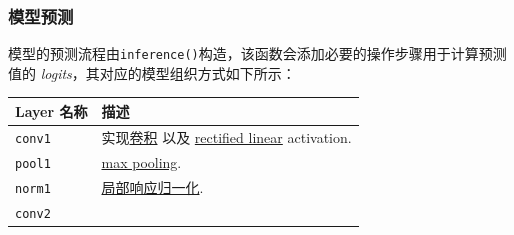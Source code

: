 \subsubsection{模型预测 }\label{ux6a21ux578bux9884ux6d4b}

模型的预测流程由\lstinline{inference()}构造，该函数会添加必要的操作步骤用于计算预测值的
\emph{logits}，其对应的模型组织方式如下所示：

\begin{longtable}[c]{@{}ll@{}}
\toprule
\begin{minipage}[b]{0.05\columnwidth}\raggedright\strut
Layer 名称
\strut\end{minipage} &
\begin{minipage}[b]{0.05\columnwidth}\raggedright\strut
描述
\strut\end{minipage}\tabularnewline
\midrule
\endhead
\begin{minipage}[t]{0.05\columnwidth}\raggedright\strut
\lstinline{conv1}
\strut\end{minipage} &
\begin{minipage}[t]{0.05\columnwidth}\raggedright\strut
实现\href{https://github.com/jikexueyuanwiki/tensorflow-zh/blob/master/SOURCE/api_docs/python/nn.md\#conv2d}{卷积}
以及
\href{https://github.com/jikexueyuanwiki/tensorflow-zh/blob/master/SOURCE/api_docs/python/nn.md\#relu}{rectified
linear} activation.
\strut\end{minipage}\tabularnewline
\begin{minipage}[t]{0.05\columnwidth}\raggedright\strut
\lstinline{pool1}
\strut\end{minipage} &
\begin{minipage}[t]{0.05\columnwidth}\raggedright\strut
\href{https://github.com/jikexueyuanwiki/tensorflow-zh/blob/master/SOURCE/api_docs/python/nn.md\#max_pool}{max
pooling}.
\strut\end{minipage}\tabularnewline
\begin{minipage}[t]{0.05\columnwidth}\raggedright\strut
\lstinline{norm1}
\strut\end{minipage} &
\begin{minipage}[t]{0.05\columnwidth}\raggedright\strut
\href{https://github.com/jikexueyuanwiki/tensorflow-zh/blob/master/SOURCE/api_docs/python/nn.md\#local_response_normalization}{局部响应归一化}.
\strut\end{minipage}\tabularnewline
\begin{minipage}[t]{0.05\columnwidth}\raggedright\strut
\lstinline{conv2}
\strut\end{minipage} &

\end{longtable}
